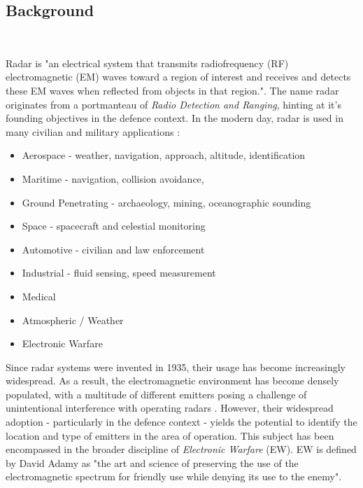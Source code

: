 \subsection{Background}~\label{subsec:background}

Radar is "an electrical system that transmits radiofrequency (RF) electromagnetic (EM) waves toward a region of interest and receives and detects these EM waves when reflected
from objects in that region."\cite{richards_principles_2010}. The name radar originates from a portmanteau of \textit{Radio Detection and Ranging}\cite{the_joint_board_on_scientific_information_policy_radar_1945}, hinting at it's founding objectives in the defence context. In the modern day, radar is used in many civilian and military applications \cite{merrill_i_skolnik_radar_nodate, desai_how_2022}:
\begin{itemize}
    \item Aerospace - weather, navigation, approach, altitude, identification
    \item Maritime - navigation, collision avoidance,  
    \item Ground Penetrating - archaeology, mining, oceanographic sounding
    \item Space - spacecraft and celestial monitoring
    \item Automotive - civilian and law enforcement
    \item Industrial - fluid sensing, speed measurement
    \item Medical
    \item Atmospheric / Weather
    \item Electronic Warfare
\end{itemize}

Since radar systems were invented in 1935\cite{}, their usage has become increasingly widespread. As a result, the electromagnetic environment has become densely populated, with a multitude of different emitters posing a challenge of unintentional interference with operating radars \cite{}. However, their widespread adoption - particularly in the defence context - yields the potential to identify the location and type of emitters in the area of operation.
This subject has been encompassed in the broader discipline of \textit{Electronic Warfare} (EW). EW is defined by David Adamy  as "the art and science of preserving the use of the electromagnetic spectrum for friendly use while denying its use to the enemy".

